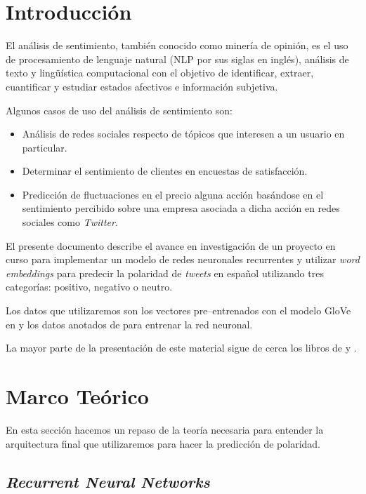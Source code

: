 \documentclass[12pt]{article}
\begin{document}
\tableofcontents
    
\section{Introducción}

El análisis de sentimiento, también conocido como minería de opinión, es el uso de procesamiento de lenguaje natural (NLP por sus siglas en inglés), análisis de texto y lingüística computacional con el objetivo de identificar, extraer, cuantificar y estudiar estados afectivos e información subjetiva.

Algunos casos de uso del análisis de sentimiento son:
\begin{itemize}
    \item Análisis de redes sociales respecto de tópicos que interesen a un usuario en particular.
    \item Determinar el sentimiento de clientes en encuestas de satisfacción.
    \item Predicción de fluctuaciones en el precio alguna acción basándose en el sentimiento percibido sobre una empresa asociada a dicha acción en redes sociales como \textit{Twitter}.
\end{itemize}

El presente documento describe el avance en investigación de un proyecto en curso para implementar un modelo de redes neuronales recurrentes y utilizar \textit{word embeddings} para predecir la polaridad de \textit{tweets} en español utilizando tres categorías: positivo, negativo o neutro.

Los datos que utilizaremos son los vectores pre--entrenados con el modelo GloVe en \parencite{Etcheverry2016} y los datos anotados de \parencite{TASS2020} para entrenar la red neuronal.

La mayor parte de la presentación de este material sigue de cerca los libros de \parencite{Zhang2021} y \parencite{Goodfellow2016}.

\section{Marco Teórico} 

En esta sección hacemos un repaso de la teoría necesaria para entender la arquitectura final que utilizaremos para hacer la predicción de polaridad. 

\subsection{\textit{Recurrent Neural Networks}}
\end{document}
